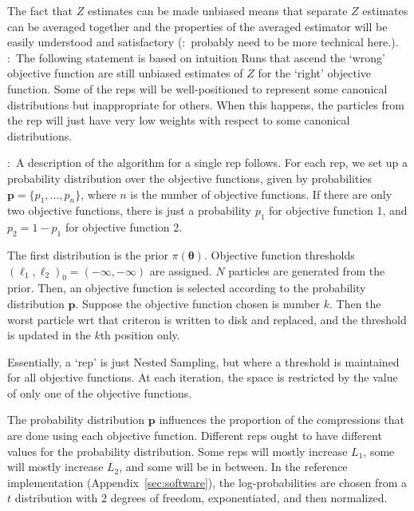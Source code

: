 \documentclass[entropy,article,submit,moreauthors,pdftex,10pt,a4paper]{Definitions/mdpi}
\newcommand{\xx}{\boldsymbol{\theta}}
\newcommand{\todo}{\color{blue}{\bf TODO}:~}
\begin{document}
The fact that $Z$ estimates can be made unbiased means that separate $Z$
estimates can be averaged together and the properties of the averaged estimator
will be easily understood and satisfactory ({\todo probably need to be more
technical here.}). {\todo The following statement is based on intuition}
Runs that ascend the `wrong' objective function are still unbiased
estimates of $Z$ for the `right' objective function. Some of the reps will
be well-positioned to represent some canonical distributions but inappropriate
for others. When this happens, the particles from the rep will just have very
low weights with respect to some canonical distributions.

{\todo A description of the algorithm for a single rep follows}.
For each rep, we set up a probability distribution over the objective functions,
given by probabilities $\boldsymbol{p} = \{p_1, ..., p_n\}$,
where $n$ is the number of
objective functions. If there
are only two objective functions, there is just a probability $p_1$ for
objective function 1, and $p_2 = 1-p_1$ for objective function 2.

The first distribution is the prior $\pi(\xx)$. Objective function thresholds
$(\ell_1, \ell_2)_0 = (-\infty, -\infty)$ are assigned.
$N$ particles are generated
from the prior. Then, an objective function is selected according to the
probability distribution $\boldsymbol{p}$.
Suppose the objective function chosen is number $k$.
Then the worst particle wrt that criteron is written to disk and replaced,
and the threshold is updated in the $k$th position only.

Essentially, a `rep' is just Nested Sampling, but where a threshold is
maintained for all objective functions. At each iteration, the space is
restricted by the value of only one of the objective functions.

The probability distribution $\boldsymbol{p}$ influences the
proportion of the compressions that are done using each objective function.
Different reps ought to have different values for the probability distribution.
Some reps will mostly increase $L_1$, some will mostly increase $L_2$, and
some will be in between. In the reference implementation
(Appendix~\ref{sec:software}), the log-probabilities are chosen from a $t$
distribution with 2 degrees of freedom, exponentiated, and then normalized.
\end{document}

